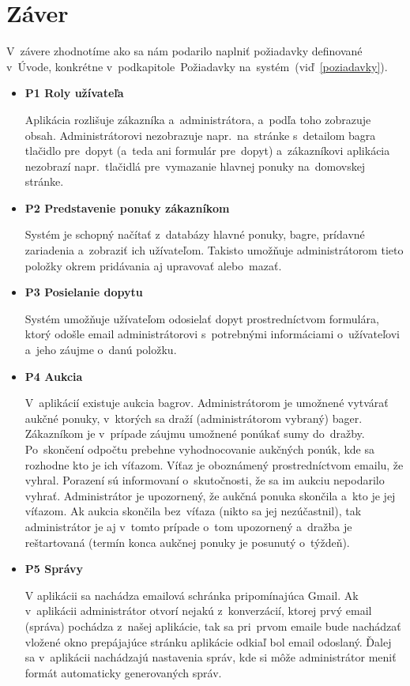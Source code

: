 \chapter{Záver}

V~závere zhodnotíme ako sa nám podarilo naplniť požiadavky definované v~Úvode, konkrétne v~podkapitole~Požiadavky na~systém~(viď~\ref{poziadavky}).

\begin{itemize}
\item \textbf{P1 Roly užívateľa}

Aplikácia rozlišuje zákazníka a~administrátora, a~podľa toho zobrazuje obsah. Administrátorovi nezobrazuje napr.~na~stránke s~detailom bagra tlačidlo pre~dopyt (a~teda ani formulár pre~dopyt) a~zákazníkovi aplikácia nezobrazí napr.~tlačidlá pre~vymazanie hlavnej ponuky na~domovskej stránke.

\item \textbf{P2 Predstavenie ponuky zákazníkom}

Systém je schopný načítať z~databázy hlavné ponuky, bagre, prídavné zariadenia a~zobraziť ich užívateľom. Takisto umožňuje administrátorom tieto položky okrem pridávania aj upravovať alebo~mazať.

\item \textbf{P3 Posielanie dopytu}

Systém umožňuje užívateľom odosielať dopyt prostredníctvom formulára, ktorý odošle email administrátorovi s~potrebnými informáciami o~užívateľovi a~jeho záujme o~danú položku.

\item \textbf{P4 Aukcia}

V~aplikácií existuje aukcia bagrov. Administrátorom je umožnené vytvárať aukčné ponuky, v~ktorých sa draží (administrátorom vybraný) bager. Zákazníkom je v~prípade záujmu umožnené ponúkať sumy do~dražby. Po~skončení odpočtu prebehne vyhodnocovanie aukčných ponúk, kde sa rozhodne kto je ich víťazom. Víťaz je oboznámený prostredníctvom emailu, že vyhral. Porazení sú informovaní o~skutočnosti, že sa im aukciu nepodarilo vyhrať. Administrátor je upozornený, že aukčná ponuka skončila a~kto je jej víťazom. Ak aukcia skončila bez~víťaza (nikto sa jej nezúčastnil), tak administrátor je aj v~tomto prípade o~tom upozornený a~dražba je reštartovaná (termín konca aukčnej ponuky je posunutý o~týždeň).

\item \textbf{P5 Správy}

V aplikácii sa nachádza emailová schránka pripomínajúca Gmail. Ak v~aplikácii administrátor otvorí nejakú z~konverzácií, ktorej prvý email (správa) pochádza z~našej aplikácie, tak sa pri~prvom emaile bude nachádzať vložené okno prepájajúce stránku aplikácie odkiaľ bol email odoslaný. Ďalej sa v~aplikácii nachádzajú nastavenia správ, kde si môže administrátor meniť formát automaticky generovaných správ.


\end{itemize}
